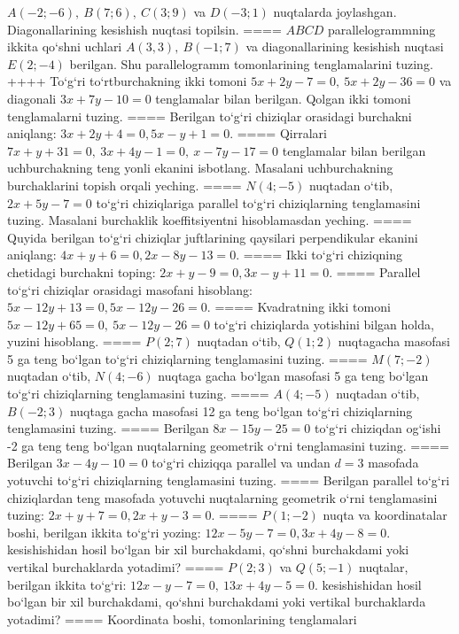 \(A (-2;-6),\ B (7;6),\ C (3;9) \) va \(D (-3;1) \) nuqtalarda
joylashgan. Diagonallarining kesishish nuqtasi topilsin.
====
$ABCD$ parallelogrammning ikkita qo‘shni uchlari
\(A (3,3),\ B (-1;7) \) va diagonallarining kesishish nuqtasi
\(E (2;-4) \) berilgan. Shu parallelogramm tomonlarining tenglamalarini
tuzing.
++++
To‘g‘ri to‘rtburchakning ikki tomoni
\(5x+2y-7=0,\ 5x+2y-36=0\) va diagonali
\(3x+7y-10=0\) tenglamalar bilan berilgan. Qolgan ikki tomoni
tenglamalarni tuzing.
====
Berilgan to‘g‘ri chiziqlar orasidagi burchakni aniqlang: $3x+2y+4=0, 5x-y+1=0$.
====
Qirralari
\(7x+y+31=0,\ 3x+4y-1=0,\ x-7y-17=0\) tenglamalar
bilan berilgan uchburchakning teng yonli ekanini isbotlang.
Masalani uchburchakning
burchaklarini topish orqali yeching.
====
\(N (4;-5) \) nuqtadan o‘tib, $2x+5y-7=0$
to‘g‘ri chiziqlariga parallel to‘g‘ri chiziqlarning tenglamasini tuzing. Masalani burchaklik
koeffitsiyentni hisoblamasdan yeching.
====
Quyida berilgan to‘g‘ri chiziqlar juftlarining qaysilari
perpendikular ekanini aniqlang: $4x+y+6=0, 2x-8y-13=0$.
====
Ikki to‘g‘ri chiziqning chetidagi burchakni toping: $2x+y-9=0, 3x-y+11=0$.
====
Parallel to‘g‘ri chiziqlar orasidagi masofani hisoblang: $5x-12y+13=0, 5x-12y-26=0$.
====
Kvadratning ikki tomoni
\(5x-12y+65=0,\ 5x-12y-26=0\) to‘g‘ri chiziqlarda
yotishini bilgan holda, yuzini hisoblang.
====
\(P (2;7) \) nuqtadan o‘tib, \(Q (1;2) \) nuqtagacha
masofasi 5 ga teng bo‘lgan to‘g‘ri chiziqlarning tenglamasini tuzing.
====
\(M (7;-2) \) nuqtadan o‘tib, \(N (4;-6) \) nuqtaga
gacha bo‘lgan masofasi 5 ga teng bo‘lgan to‘g‘ri chiziqlarning tenglamasini tuzing.
====
\(A (4;-5) \) nuqtadan o‘tib, \(B (-2;3) \) nuqtaga
gacha masofasi 12 ga teng bo‘lgan to‘g‘ri chiziqlarning tenglamasini tuzing.
====
Berilgan \(8x-15y-25=0\) to‘g‘ri chiziqdan og‘ishi -2 ga teng
teng bo‘lgan nuqtalarning geometrik o‘rni tenglamasini tuzing.
====
Berilgan \(3x-4y-10=0\) to‘g‘ri chiziqqa parallel va undan
$d=3$ masofada yotuvchi to‘g‘ri chiziqlarning tenglamasini tuzing.
====
Berilgan parallel to‘g‘ri chiziqlardan teng masofada yotuvchi
nuqtalarning geometrik o‘rni tenglamasini tuzing: $2x+y+7=0, 2x+y-3=0$.
====
\(P (1;-2) \) nuqta va koordinatalar boshi, berilgan ikkita
to‘g‘ri yozing: $12x-5y-7=0, 3x+4y-8=0$.
kesishishidan hosil bo‘lgan bir xil burchakdami, qo‘shni burchakdami yoki vertikal
burchaklarda yotadimi?
====
\(P (2;3) \) va \(Q (5;-1) \) nuqtalar, berilgan ikkita
to‘g‘ri: $12x-y-7=0,\ 13x+4y-5=0$.
kesishishidan hosil bo‘lgan bir xil burchakdami, qo‘shni burchakdami yoki vertikal
burchaklarda yotadimi?
====
Koordinata boshi, tomonlarining tenglamalari
